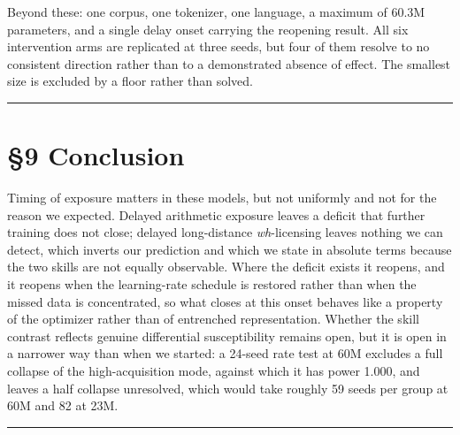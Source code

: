 \documentclass[11pt]{article}
\begin{document}
Beyond these: one corpus, one tokenizer, one language, a maximum of 60.3M parameters, and a
single delay onset carrying the reopening result. All six intervention arms are replicated at
three seeds, but four of them resolve to no consistent direction rather than to a
demonstrated absence of effect. The smallest size is excluded by a floor rather than solved.

\begin{center}\rule{0.5\linewidth}{0.5pt}\end{center}

\section{§9 Conclusion}\label{conclusion}

Timing of exposure matters in these models, but not uniformly and not for the reason we
expected. Delayed arithmetic exposure leaves a deficit that further training does not close;
delayed long-distance \emph{wh}-licensing leaves nothing we can detect, which inverts our
prediction and which we state in absolute terms because the two skills are not equally
observable. Where the deficit exists it reopens, and it reopens when the learning-rate
schedule is restored rather than when the missed data is concentrated, so what closes at
this onset behaves like a property of the optimizer rather than of entrenched representation.
Whether the skill contrast reflects genuine differential susceptibility remains open, but it
is open in a narrower way than when we started: a 24-seed rate test at 60M excludes a full
collapse of the high-acquisition mode, against which it has power 1.000, and leaves a half
collapse unresolved, which would take roughly 59 seeds per group at 60M and 82 at 23M.

\begin{center}\rule{0.5\linewidth}{0.5pt}\end{center}
\end{document}
